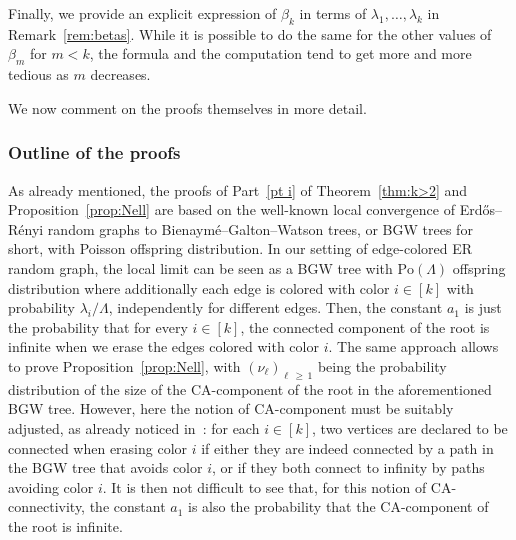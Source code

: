 \documentclass[10pt]{amsart}
\theoremstyle{definition}\newtheorem{defi}[theo]{Definition}\newtheorem{rema}[theo]{Remark}\newtheorem{exam}[theo]{Example}\newtheorem{exem}[theo]{Example}\newtheorem{nota}[theo]{Notation}
\begin{document}
Finally, we provide an explicit expression of $\beta_k$ in terms of $\lambda_1,\ldots,\lambda_k$ in Remark~\ref{rem:betas}. While it is possible to do the same for the other values of $\beta_m$ for $m<k$, the formula and the computation tend to get more and more tedious as $m$ decreases.


We now comment on the proofs themselves in more detail.


\subsubsection*{Outline of the proofs}
As already mentioned, the proofs of Part~\eqref{pt i} of Theorem~\ref{thm:k>2} and Proposition~\ref{prop:Nell} are based on the well-known local convergence of Erd\H{o}s--Rényi random graphs to Bienaymé--Galton--Watson trees, or BGW trees for short, with Poisson offspring distribution. In our setting of edge-colored ER random graph, the local limit can be seen as a BGW tree with $\text{Po}(\Lambda)$ offspring distribution where additionally each edge is colored with color $i\in [k]$ with probability $\lambda_i/\Lambda$, independently for different edges. Then, the constant $a_1$ is just the probability that for every $i\in [k]$, the connected component of the root is infinite when we erase the edges colored with color $i$. The same approach allows to prove Proposition~\ref{prop:Nell}, with $(\nu_\ell)_{\ell\,\ge\,1}$ being the probability distribution of the size of the CA-component of the root in the aforementioned BGW tree. However, here the notion of CA-component must be suitably adjusted, as already noticed in~\cite{RVFM22.0}: for each $i\in [k]$, two vertices are declared to be connected when erasing color $i$ if either they are indeed connected by a path in the BGW tree that avoids color $i$, or if they both connect to infinity by paths avoiding color $i$. It is then not difficult to see that, for this notion of CA-connectivity, the constant $a_1$ is also the probability that the CA-component of the root is infinite.
\end{document}

